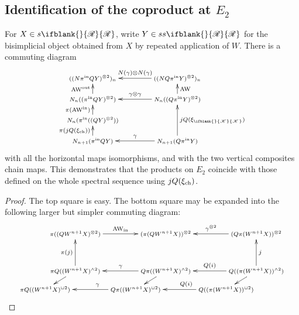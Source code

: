 \documentclass[10pt]{article}
\newcommand{\PRLie}[1]%
{\ifblank{#1}{\scrR}{\scrR^{#1}}}
\newcommand{\LL}[1]{\ifblank{#1}{\scrK}{\scrK^{#1}}}
\begin{document}
\begin{backgroundOnMultiplicativity}
\subsection{Identification of the coproduct at $E_2$}
\begin{thm}
For $X\in s\PRLie{}$, write $Y\in ss\PRLie{}$ for the bisimplicial object obtained from $X$ by repeated application of $W$. There is a commuting diagram
\[\xymatrix@C=13mm@R=4mm{
((N\pi^{\textup{in}}QY)^{\otimes2})_n&%
((NQ\pi^{\textup{in}}Y)^{\otimes2})_{n}
\ar[l]_-{N(\gamma)\otimes N(\gamma)}
\\%
N_n((\pi^{\textup{in}}QY)^{\otimes2})
\ar[u]^-{\textup{AW}^\textup{out}}
&%
N_n((Q\pi^{\textup{in}}Y)^{\otimes2})
\ar[u]_-{\textup{AW}}
\ar[l]_-{\gamma\otimes\gamma}
\\%
N_n(\pi^\textup{in}((QY)^{\otimes2}))
\ar[u]^-{\pi(\textup{AW}^\textup{in})}
&%
\\%
N_{n+1}(\pi^\textup{in} QY)
\ar[u]^-{\pi(j\circ Q(\xi_\textup{ch}))}
&%
N_{n+1}(Q\pi^\textup{in} Y)
\ar[uu]_-{j\circ Q(\xi_{\LL{}})}
\ar[l]_-{\gamma}
}\]
with all the horizontal maps isomorphisms, and with the two vertical composites chain maps. This demonstrates that the products on $E_2$ coincide with those defined on the whole spectral sequence using $j\circ Q(\xi_\textup{ch})$.
\end{thm}
\begin{proof}
The top square is easy. The bottom square may be expanded into the following larger but simpler commuting diagram:
\[
\def\objectstyle{\scriptstyle}
\xymatrix@R=8mm@C=13mm@!0{
&%
\pi((QW^{n+1}X)^{\otimes2})\ar[rrr]^-{\textup{AW}_{\textup{in}}}
&%
&%
&%
(\pi (QW^{n+1}X))^{\otimes2}&%
&%
&%
(Q\pi(W^{n+1}X))^{\otimes2}\ar[lll]_-{\gamma^{\otimes2}}\\\\%
&%
\pi Q((W^{n+1}X)^{\wedge 2})\ar[uu]^-{\pi(j)}
\ar[dl]
&%
&%
&%
Q\pi((W^{n+1}X)^{\wedge 2})\ar[lll]_-{\gamma}\ar[dl]
&%
&%
&%
Q((\pi( W^{n+1}X))^{\wedge 2})\ar[dl]
\ar[uu]_-{j}
\ar[lll]_-{Q(i)}
\\
\pi Q((W^{n+1}X)^{\sqcup 2})
&%
&%
&%
Q\pi((W^{n+1}X)^{\sqcup 2})\ar[lll]_-(.3){\gamma}
&%
&%
&%
Q((\pi( W^{n+1}X))^{\sqcup 2})
\ar[lll]_-(.3){Q(i)}
}\]
\end{proof}
\end{backgroundOnMultiplicativity}
\end{document}
